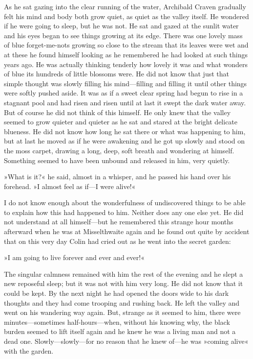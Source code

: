 As he sat gazing into the clear running of the water, Archibald Craven gradually felt his mind and body both grow quiet, as quiet as the valley itself. He wondered if he were going to sleep, but he was not. He sat and gazed at the sunlit water and his eyes began to see things growing at its edge. There was one lovely mass of blue forget-me-nots growing so close to the stream that its leaves were wet and at these he found himself looking as he remembered he had looked at such things years ago. He was actually thinking tenderly how lovely it was and what wonders of blue its hundreds of little blossoms were. He did not know that just that simple thought was slowly filling his mind—filling and filling it until other things were softly pushed aside. It was as if a sweet clear spring had begun to rise in a stagnant pool and had risen and risen until at last it swept the dark water away. But of course he did not think of this himself. He only knew that the valley seemed to grow quieter and quieter as he sat and stared at the bright delicate blueness. He did not know how long he sat there or what was happening to him, but at last he moved as if he were awakening and he got up slowly and stood on the moss carpet, drawing a long, deep, soft breath and wondering at himself. Something seemed to have been unbound and released in him, very quietly.

»What is it?« he said, almost in a whisper, and he passed his hand over his forehead. »I almost feel as if—I were alive!«

I do not know enough about the wonderfulness of undiscovered things to be able to explain how this had happened to him. Neither does any one else yet. He did not understand at all himself—but he remembered this strange hour months afterward when he was at Misselthwaite again and he found out quite by accident that on this very day Colin had cried out as he went into the secret garden:

»I am going to live forever and ever and ever!«

The singular calmness remained with him the rest of the evening and he slept a new reposeful sleep; but it was not with him very long. He did not know that it could be kept. By the next night he had opened the doors wide to his dark thoughts and they had come trooping and rushing back. He left the valley and went on his wandering way again. But, strange as it seemed to him, there were minutes—sometimes half-hours—when, without his knowing why, the black burden seemed to lift itself again and he knew he was a living man and not a dead one. Slowly—slowly—for no reason that he knew of—he was »coming alive« with the garden.

